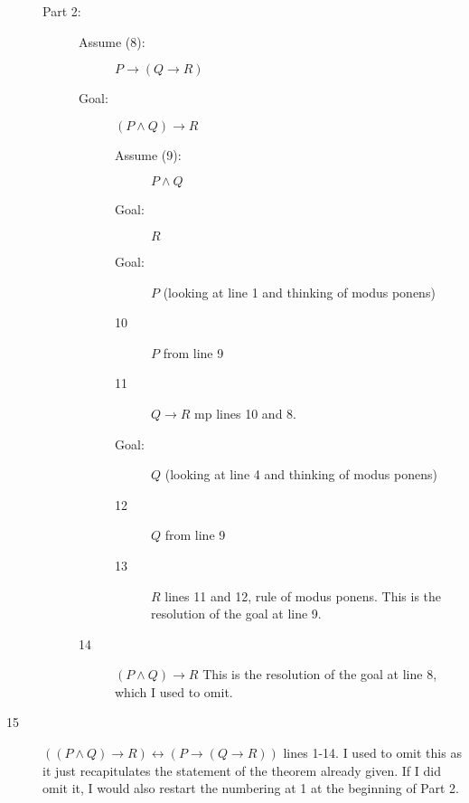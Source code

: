 \documentclass[12pt]{book}
\begin{document}
\begin{description}
\begin{description}
\begin{description}
\end{description}

\newpage
\item[Part 2:]

\begin {description}

\item[Assume (8):] $P \rightarrow (Q \rightarrow R)$

\item[Goal:]  $(P \wedge Q) \rightarrow R$

\begin{description}

\item[Assume (9):]  $P \wedge Q$

\item[Goal:] $R$

\item[Goal:]  $P$ (looking at line 1 and thinking of modus ponens)

\item[10]  $P$ from line 9

\item[11]  $Q \rightarrow R$  mp lines 10 and 8.

\item[Goal:]  $Q$  (looking at line 4 and thinking of modus ponens)

\item[12] $Q$  from line 9

\item [13] $R$ lines 11 and 12, rule of modus ponens.  This is the resolution of the goal at line 9.

\end{description}

\item[14]  $(P \wedge Q) \rightarrow R$  This is the resolution of the goal at line 8, which I used to omit.

\end{description}

\end{description}

\item[15]  $((P \wedge Q) \rightarrow R) \leftrightarrow (P \rightarrow (Q \rightarrow R))$  lines 1-14.  I used to omit this as it just recapitulates the statement of the theorem already given.  If I did omit it, I would also restart the numbering at 1 at the beginning of Part 2.

\newpage


\end{description}
\end{document}
